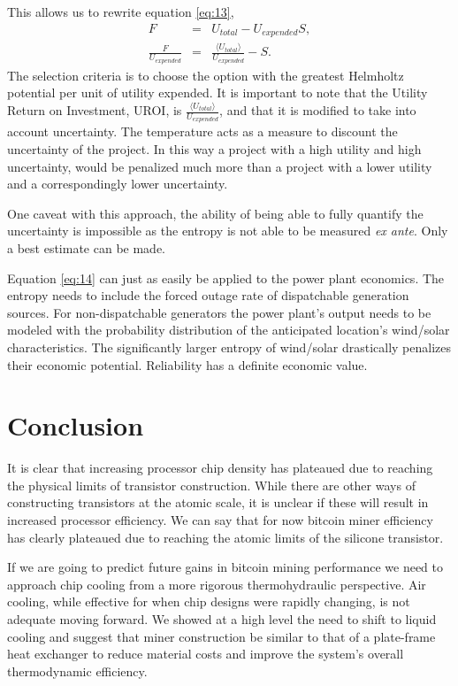 \documentclass[runningheads]{llncs}
\begin{document}
This allows us to rewrite equation \ref{eq:13},
\begin{eqnarray}
    F &=& U_{total} - U_{expended} S, \\
    \frac{F}{U_{expended}} &=& \frac{\langle U_{total}\rangle}{U_{expended}} - S. \label{eq:14}
\end{eqnarray}
The selection criteria is to choose the option with the greatest Helmholtz potential per unit of utility expended.
It is important to note that the Utility Return on Investment, UROI, is $\frac{\langle U_{total}\rangle}{U_{expended}}$, and that it is modified to take into account uncertainty.
The temperature acts as a measure to discount the uncertainty of the project.
In this way a project with a high utility and high uncertainty, would be penalized much more than a project with a lower utility and a correspondingly lower uncertainty.

One caveat with this approach, the ability of being able to fully quantify the uncertainty is impossible as the entropy is not able to be measured \emph{ex ante}.
Only a best estimate can be made.

Equation \ref{eq:14} can just as easily be applied to the power plant economics.
The entropy needs to include the forced outage rate of dispatchable generation sources.
For non-dispatchable generators the power plant's output needs to be modeled with the probability distribution of the anticipated location's wind/solar characteristics.
The significantly larger entropy of wind/solar drastically penalizes their economic potential.
Reliability has a definite economic value.

\section{Conclusion}

It is clear that increasing processor chip density has plateaued due to reaching the physical limits of transistor construction.
While there are other ways of constructing transistors at the atomic scale, it is unclear if these will result in increased processor efficiency.
We can say that for now bitcoin miner efficiency has clearly plateaued due to reaching the atomic limits of the silicone transistor.

If we are going to predict future gains in bitcoin mining performance we need to approach chip cooling from a more rigorous thermohydraulic perspective.
Air cooling, while effective for when chip designs were rapidly changing, is not adequate moving forward.
We showed at a high level the need to shift to liquid cooling and suggest that miner construction be similar to that of a plate-frame heat exchanger to reduce material costs and improve the system's overall thermodynamic efficiency.
\end{document}
